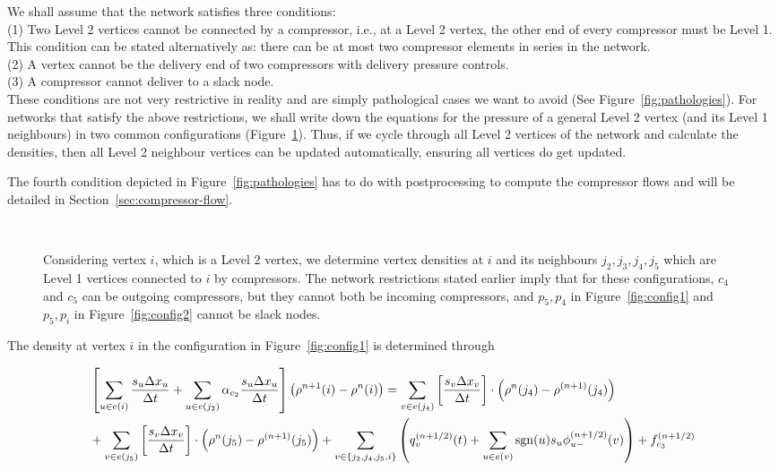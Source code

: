 \documentclass{amsart}
\DeclareMathOperator{\sgn}{sgn}
\begin{document}
We shall assume that the network satisfies three conditions: \\
(1) Two Level 2 vertices cannot be connected by a compressor, i.e., at a  Level 2 vertex, the other end of every compressor must be Level 1. This condition can be stated  alternatively as: there can be at most two compressor elements in series in the network. \\
(2) A vertex cannot be the delivery end of two  compressors with delivery pressure controls. \\
(3) A compressor cannot deliver to a slack node. \\
These conditions are not very restrictive in reality and are simply pathological cases we want to avoid (See Figure~\ref{fig:pathologies}).
For networks that satisfy the above restrictions, we shall write down the equations for the pressure of a  general Level 2 vertex (and its Level 1 neighbours) in two common configurations (Figure~\ref{fig:configs}). Thus, if we cycle through all  Level 2 vertices of the network and calculate the densities, then all Level 2 neighbour vertices can be updated automatically, ensuring all vertices do get updated. 


The fourth condition depicted in Figure~\ref{fig:pathologies} has to do with postprocessing to compute the compressor flows and will be detailed in Section~\ref{sec:compressor-flow}.



\begin{figure}[htb]
\centering
{}\\
\caption{Considering vertex $i$, which is a Level 2 vertex, we determine vertex densities at $i$ and its neighbours $j_2, j_3, j_4, j_5$  which are Level 1 vertices connected to $i$ by compressors. The network restrictions stated earlier imply that for these configurations, $c_4$ and $c_5$ can be outgoing compressors, but they cannot both be incoming compressors, and $p_5, p_4$ in Figure~\ref{fig:config1} and $p_5, p_i$ in
Figure~\ref{fig:config2} cannot be slack nodes.}
\label{fig:configs}
\end{figure}



The density at vertex $i$ in the configuration in Figure~\ref{fig:config1} is determined through

\begin{align}
& \left[ \sum_{u \in e(i)}\frac{s_{u} \Delta x_{u}}{\Delta t} + \sum_{u \in e(j_2)}\alpha_{c_2}\frac{s_{u} \Delta x_{u}}{\Delta t} \right] \left( \rho^{n+1}(i) - \rho^n(i) \right) =  \sum_{v \in e(j_4)}\left[\frac{s_{v} \Delta x_{v}}{\Delta t}\right] \cdot \left(\rho^{n}(j_4) - \rho^{(n+1)}(j_4) \right) \notag \\
& + \sum_{v \in e(j_5)}\left[\frac{s_{v} \Delta x_{v}}{\Delta t}\right] \cdot \left(\rho^{n}(j_5) - \rho^{(n+1)}(j_5) \right) 
+\sum_{v \in \{j_2, j_4, j_5, i\}} \left( q^{(n+1/2)}_{v}(t) + \sum_{u \in e(v)}\sgn(u) s_{u} \phi_{u-}^{(n+1/2)}(v) \right) + f^{(n+1/2)}_{c_3}
\label{eqn:config1}
\end{align}
\end{document}
